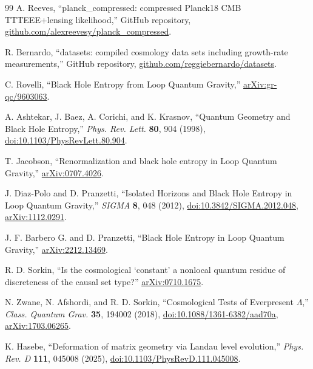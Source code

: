 \documentclass[aps,prd,reprint,nofootinbib,superscriptaddress,floatfix]{revtex4-2}
\numberwithin{equation}{section}
\theoremstyle{definition}
\theoremstyle{plain}
\begin{document}
\begin{thebibliography}{99}
A. Reeves,
``planck\_compressed: compressed Planck18 CMB TTTEEE+lensing likelihood,''
GitHub repository,
\href{https://github.com/alexreevesy/planck_compressed}{github.com/alexreevesy/planck\_compressed}.

R. Bernardo,
``datasets: compiled cosmology data sets including growth-rate measurements,''
GitHub repository,
\href{https://github.com/reggiebernardo/datasets}{github.com/reggiebernardo/datasets}.


C. Rovelli,
``Black Hole Entropy from Loop Quantum Gravity,''
\href{https://arxiv.org/abs/gr-qc/9603063}{arXiv:gr-qc/9603063}.

A. Ashtekar, J. Baez, A. Corichi, and K. Krasnov,
``Quantum Geometry and Black Hole Entropy,''
\emph{Phys. Rev. Lett.} \textbf{80}, 904 (1998),
\href{https://doi.org/10.1103/PhysRevLett.80.904}{doi:10.1103/PhysRevLett.80.904}.

T. Jacobson,
``Renormalization and black hole entropy in Loop Quantum Gravity,''
\href{https://arxiv.org/abs/0707.4026}{arXiv:0707.4026}.

J. Diaz-Polo and D. Pranzetti,
``Isolated Horizons and Black Hole Entropy in Loop Quantum Gravity,''
\emph{SIGMA} \textbf{8}, 048 (2012),
\href{https://doi.org/10.3842/SIGMA.2012.048}{doi:10.3842/SIGMA.2012.048},
\href{https://arxiv.org/abs/1112.0291}{arXiv:1112.0291}.

J. F. Barbero G. and D. Pranzetti,
``Black Hole Entropy in Loop Quantum Gravity,''
\href{https://arxiv.org/abs/2212.13469}{arXiv:2212.13469}.

R. D. Sorkin,
``Is the cosmological `constant' a nonlocal quantum residue of discreteness of the causal set type?''
\href{https://arxiv.org/abs/0710.1675}{arXiv:0710.1675}.

N. Zwane, N. Afshordi, and R. D. Sorkin,
``Cosmological Tests of Everpresent \(\Lambda\),''
\emph{Class. Quantum Grav.} \textbf{35}, 194002 (2018),
\href{https://doi.org/10.1088/1361-6382/aad70a}{doi:10.1088/1361-6382/aad70a},
\href{https://arxiv.org/abs/1703.06265}{arXiv:1703.06265}.

K. Hasebe,
``Deformation of matrix geometry via Landau level evolution,''
\emph{Phys. Rev. D} \textbf{111}, 045008 (2025),
\href{https://doi.org/10.1103/PhysRevD.111.045008}{doi:10.1103/PhysRevD.111.045008}.





\end{thebibliography}
\end{document}
